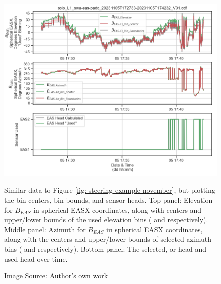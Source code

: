 \begin{figure}[h!]
    \centering
    \centerfloat
    \includegraphics[width=1.05\linewidth]{figures/Steering Example (bin issue).png}
    \caption{Similar data to Figure \ref{fig: steering example november}, but plotting the  bin centers, bin bounds, and sensor heads. Top panel: Elevation for \(B_{EAS}\) in spherical EASX coordinates, along with centers and upper/lower bounds of the used elevation bins ( and  respectively). Middle panel: Azimuth for \(B_{EAS}\) in spherical EASX coordinates, along with the centers and upper/lower bounds of selected azimuth bins ( and  respectively). Bottom panel: The selected, or  head and used head over time.}
    \caption*{Image Source: Author's own work}
    \label{fig: november bin error}
\end{figure}

